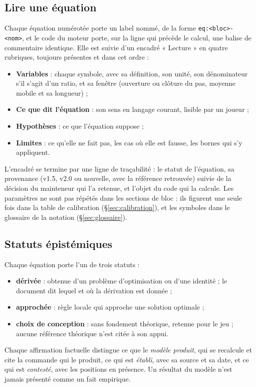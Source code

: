 \documentclass[11pt,a4paper]{article}
\begin{document}
\subsection*{Lire une équation}
Chaque équation numérotée porte un label nommé, de la forme \texttt{eq:<bloc>-<nom>}, et le code du moteur porte, sur la ligne qui précède le calcul, une balise de commentaire identique. Elle est suivie d'un encadré « Lecture » en quatre rubriques, toujours présentes et dans cet ordre :
\begin{itemize}
\item \textbf{Variables} : chaque symbole, avec sa définition, son unité, son dénominateur s'il s'agit d'un ratio, et sa fenêtre (ouverture ou clôture du pas, moyenne mobile et sa longueur) ;
\item \textbf{Ce que dit l'équation} : son sens en langage courant, lisible par un joueur ;
\item \textbf{Hypothèses} : ce que l'équation suppose ;
\item \textbf{Limites} : ce qu'elle ne fait pas, les cas où elle est fausse, les bornes qui s'y appliquent.
\end{itemize}
L'encadré se termine par une ligne de traçabilité : le statut de l'équation, sa provenance (v1.5, v2.0 ou nouvelle, avec la référence retrouvée) suivie de la décision du mainteneur qui l'a retenue, et l'objet du code qui la calcule. Les paramètres ne sont pas répétés dans les sections de bloc : ils figurent une seule fois dans la table de calibration (\S\ref{sec:calibration}), et les symboles dans le glossaire de la notation (\S\ref{sec:glossaire}).

\subsection*{Statuts épistémiques}
Chaque équation porte l'un de trois statuts :
\begin{itemize}
\item \textbf{dérivée} : obtenue d'un problème d'optimisation ou d'une identité ; le document dit lequel et où la dérivation est donnée ;
\item \textbf{approchée} : règle locale qui approche une solution optimale ;
\item \textbf{choix de conception} : sans fondement théorique, retenue pour le jeu ; aucune référence théorique n'est citée à son appui.
\end{itemize}
Chaque affirmation factuelle distingue ce que le \emph{modèle produit}, qui se recalcule et cite la commande qui le produit, ce qui est \emph{établi}, avec sa source et sa date, et ce qui est \emph{contesté}, avec les positions en présence. Un résultat du modèle n'est jamais présenté comme un fait empirique.
\end{document}
